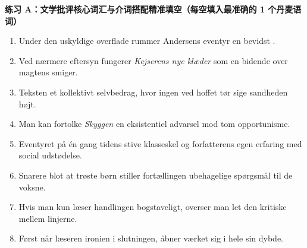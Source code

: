 
\textbf{练习 A：文学批评核心词汇与介词搭配精准填空（每空填入最准确的 1 个丹麦语词）}
\begin{enumerate}
  \item Under den uskyldige overflade rummer Andersens eventyr en bevidst \underline{\hspace{2.2cm}}.
  \item Ved nærmere eftersyn fungerer \textit{Kejserens nye klæder} som en bidende \underline{\hspace{2.2cm}} over magtens smiger.
  \item Teksten \underline{\hspace{2.2cm}} et kollektivt selvbedrag, hvor ingen ved hoffet tør sige sandheden højt.
  \item Man kan fortolke \textit{Skyggen} \underline{\hspace{2.2cm}} en eksistentiel advarsel mod tom opportunisme.
  \item Eventyret \underline{\hspace{2.2cm}} på én gang tidens stive klasseskel og forfatterens egen erfaring med social udstødelse.
  \item Snarere \underline{\hspace{2.2cm}} blot at trøste børn stiller fortællingen ubehagelige spørgsmål til de voksne.
  \item Hvis man kun læser handlingen bogstaveligt, overser man let den kritiske \underline{\hspace{2.2cm}} mellem linjerne.
  \item Først når læseren \underline{\hspace{2.2cm}} ironien i slutningen, åbner værket sig i hele sin dybde.
\end{enumerate}

